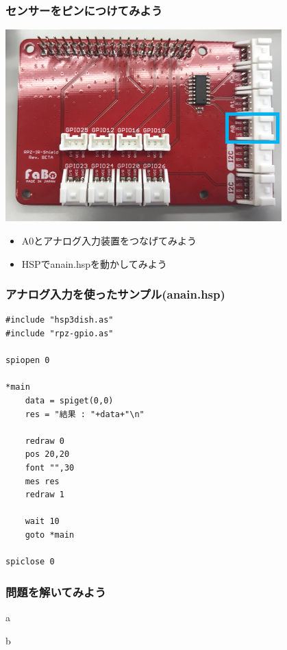 \begin{frame}
    \frametitle{センサーをピンにつけてみよう}
    \begin{center}
        \includegraphics[width=0.8\textwidth]{images/chap05/text05-img030.png}
        \begin{itemize}
            \item A0とアナログ入力装置をつなげてみよう
            \item HSPでanain.hspを動かしてみよう
        \end{itemize}
    \end{center}
\end{frame}

\begin{frame}[fragile]
    \frametitle{アナログ入力を使ったサンプル(anain.hsp)}
\begin{lstlisting}
#include "hsp3dish.as"
#include "rpz-gpio.as"

spiopen 0

*main
	data = spiget(0,0)
	res = "結果 : "+data+"\n"

	redraw 0
	pos 20,20
	font "",30
	mes res
	redraw 1

	wait 10
	goto *main

spiclose 0
\end{lstlisting}
\end{frame}

\begin{frame}[fragile]
    \frametitle{問題を解いてみよう}
    \begin{description}
        \item a
        \item b
    \end{description}
\end{frame}
